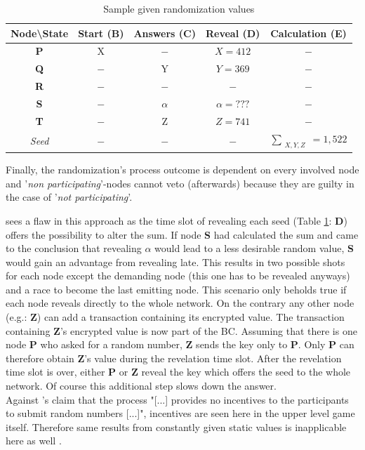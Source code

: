 \begin{enumerate}
\begin{table}[!b]
\begin{tabularx}{0.83\textwidth}{ c | c | c | c | c }
			\textbf{Node\textbackslash State} & \textbf{Start (B)} & \textbf{Answers (C)} & \textbf{Reveal (D)} & \textbf{Calculation (E)} \\ \hline
			\textbf{P} & X & $-$ & $X = 412$ & $-$ \\ \hline
			\textbf{Q} & $-$ & Y & $Y = 369$ & $-$ \\ \hline
			\textbf{R} & $-$ & $-$ & $-$ & $-$ \\ \hline
			\textbf{S} & $-$ & $\alpha$ & $\alpha = ???$ & $-$ \\ \hline
			\textbf{T} & $-$ & Z & $Z = 741$ & $-$ \\ \hline
			\textit{Seed} & $-$ & $-$ & $-$ & $\sum_{\substack{X,Y,Z}} = 1,522$ \\ \hline
		\end{tabularx}
		\caption{Sample given randomization values}
		\label{tbl:RandomizationValues}
	\end{table}
	Finally, the randomization's process outcome is dependent on every involved node and
	'\textit{non participating}'-nodes cannot veto (afterwards) because they are guilty in the case of '\textit{not participating}'.
	
	
	\citet[406]{Chatterjee.2019} sees a flaw in this approach as the time slot of revealing
	each seed (Table \ref{tbl:RandomizationValues}: \textbf{D}) offers the possibility to alter the sum.
	If node \textbf{S} had calculated the sum and came to the conclusion that revealing $\alpha$ would lead to a less desirable random value, \textbf{S} would gain an advantage from revealing late.
	This results in two possible shots for each node \citet[406]{Chatterjee.2019} except the demanding node (this one has to be revealed anyways) and a race to become the last emitting node.
	This scenario only beholds true if each node reveals directly to the whole network.
	On the contrary any other node (e.g.: \textbf{Z}) can add a transaction containing its encrypted value.
	The transaction containing \textbf{Z}'s encrypted value is now part of the \gls{BC}.
	Assuming that there is one node \textbf{P} who asked for a random number,
	\textbf{Z} sends the key only to \textbf{P}.
	Only \textbf{P} can therefore obtain \textbf{Z}'s value during the revelation time slot.
	After the revelation time slot is over, either \textbf{P} or \textbf{Z} reveal
	the key which offers the seed to the whole network.
	Of course this additional step slows down the answer. \\	
	Against \citet[406]{Chatterjee.2019}'s claim that the process "[...] provides no incentives to the participants to submit random numbers [...]", incentives are seen here in the upper level game itself.
	Therefore same results from constantly given static values is inapplicable here as well \cite[406]{Chatterjee.2019}.
\end{enumerate}

